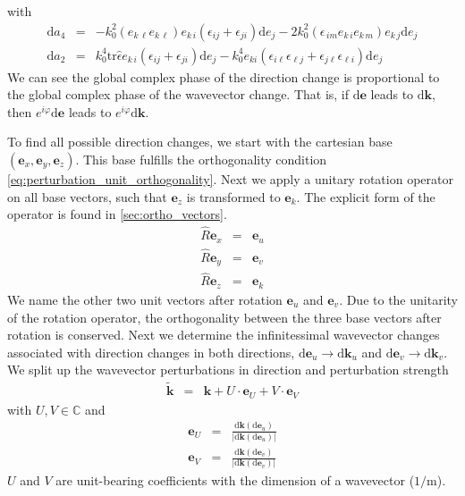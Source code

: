 \documentclass[12pt,a4paper,twoside,openright,BCOR10mm,headsepline,titlepage,abstracton,chapterprefix,final]{scrreprt}
\newcommand\Vector[1]{{\mathbf{#1}}}
\newcommand\wavenumber{k}
\newcommand\Wavevector{\Vector{\wavenumber}}
\newcommand\Tensor[1]{\hat{#1}}
\newcommand\scalarrelativepermittivity{\epsilon}
\newcommand\relativepermittivity{\Tensor{\scalarrelativepermittivity}}
\newcommand\meter{\textrm{m}}
\newcommand\totald{\textrm{d}}
\begin{document}
with
\begin{eqnarray}
 \totald a_4 &=& - k_0^2 (e_{k\,\ell} e_{k\,\ell}) e_{k\,i} ( \scalarrelativepermittivity_{ij} + \scalarrelativepermittivity_{ji} ) \totald e_{j} - 2 k_0^2 (\scalarrelativepermittivity_{\,im} e_{k\,i} e_{k\,m}) e_{k\,j} \totald e_j\\
 \totald a_2 &=&    k_0^4 \text{tr} \relativepermittivity e_{k\,i} ( \scalarrelativepermittivity_{ij} + \scalarrelativepermittivity_{ji} ) \totald e_{j} - k_0^4 e_{ki} ( \scalarrelativepermittivity_{i\ell} \scalarrelativepermittivity_{\ell j} + \scalarrelativepermittivity_{j\ell} \scalarrelativepermittivity_{\ell i} ) \totald e_{j}
\end{eqnarray}
We can see the global complex phase of the direction change is proportional to the global complex phase of the wavevector change.
That is, if $\totald \Vector{e}$ leads to $\totald \Wavevector$, 
then $e^{i\varphi} \totald \Vector{e}$ leads to $e^{i\varphi}\totald \Wavevector$.

To find all possible direction changes, we start with the cartesian base $( \Vector{e}_x, \Vector{e}_y, \Vector{e}_z )$.
This base fulfills the orthogonality condition \eqref{eq:perturbation_unit_orthogonality}.
Next we apply a unitary rotation operator on all base vectors, such that $\Vector{e}_z$ is transformed to $\Vector{e}_\wavenumber$.
The explicit form of the operator is found in \ref{sec:ortho_vectors}.
\begin{eqnarray}
 \hat{R} \Vector{e}_x &=& \Vector{e}_u \\
 \hat{R} \Vector{e}_y &=& \Vector{e}_v \\
 \hat{R} \Vector{e}_z &=& \Vector{e}_\wavenumber 
\end{eqnarray}
We name the other two unit vectors after rotation $\Vector{e}_u$ and $\Vector{e}_v$.
Due to the unitarity of the rotation operator, the orthogonality between the three base vectors after rotation is conserved.
Next we determine the infinitessimal wavevector changes associated with direction changes in both directions,
$\totald \Vector{e}_u \rightarrow \totald \Wavevector_u$ and $\totald \Vector{e}_v \rightarrow \totald \Wavevector_v$.
We split up the wavevector perturbations in direction and perturbation strength
\begin{eqnarray}
 \tilde{\Wavevector} &=& \Wavevector + U \cdot \Vector{e}_U + V \cdot \Vector{e}_V \label{eq:perturbed_wavevector}
\end{eqnarray}
with $U,V \in \mathbb{C}$ and
\begin{eqnarray}
 \Vector{e}_U &=& \frac{\totald \Wavevector(\totald \Vector{e}_u)}{|\totald \Wavevector(\totald \Vector{e}_u)|} \\
 \Vector{e}_V &=& \frac{\totald \Wavevector(\totald \Vector{e}_v)}{|\totald \Wavevector(\totald \Vector{e}_v)|} 
\end{eqnarray}
$U$ and $V$ are unit-bearing coefficients with the dimension of a wavevector ($1/\meter$).
\end{document}

